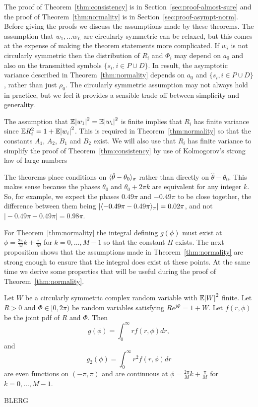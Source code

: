 \documentclass[journal]{IEEEtran}
\begin{document}
The proof of Theorem~\ref{thm:consistency} is in Section~\ref{sec:proof-almost-sure} and the proof of Theorem~\ref{thm:normality} is in Section~\ref{sec:proof-asympt-norm}.  Before giving the proofs we discuss the assumptions made by these theorems.  The assumption that $w_1, \dots w_L$ are circularly symmetric can be relaxed, but this comes at the expense of making the theorem statements more complicated.  If $w_i$ is not circularly symmetric then the distribution of $R_i$ and $\Phi_i$ may depend on $a_0$ and also on the transmitted symbols $\{s_i,i \in P \cup D\}$.  In result, the asymptotic variance described in Theorem~\ref{thm:normality} depends on $a_0$ and $\{s_i,i \in P \cup D\}$, rather than just $\rho_0$.  The circularly symmetric assumption may not always hold in practice, but we feel it provides a sensible trade off between simplicity and generality.  

The assumption that ${\mathbb E} {\vert w_1 \vert}^2 = {\mathbb E} {\vert w_i \vert}^2$ is finite implies that $R_i$ has finite variance since ${\mathbb E} R_i^2 = 1 + {\mathbb E} {\left\vert w_i \right\vert}^2$.  This is required in Theorem~\ref{thm:normality} so that the constants $A_1$, $A_2$, $B_1$ and $B_2$ exist.  We will also use that $R_i$ has finite variance to simplify the proof of Theorem~\ref{thm:consistency} by use of Kolmogorov's strong law of large numbers~\cite[Theorem 2.3.10]{SenSinger_large_sample_stats_1993}


The theorems place conditions on $\langle \hat{\theta} - \theta_0 \rangle_\pi$ rather than directly on $\hat{\theta} - \theta_0$.  This makes sense because the phases $\theta_0$ and $\theta_0 + 2\pi k$ are equivalent for any integer $k$. So, for example, we expect the phases $0.49\pi$ and $-0.49\pi$ to be close together, the difference between them being $\vert\langle -0.49\pi - 0.49\pi \rangle_\pi\vert = 0.02\pi$, and not $\vert -0.49\pi - 0.49\pi\vert = 0.98\pi$.

For Theorem~\ref{thm:normality} the integral defining $g(\phi)$ must exist at $\phi = \tfrac{2\pi}{M}k + \frac{\pi}{M}$ for $k = 0, \dots, M-1$ so that the constant $H$ exists.  The next proposition shows that the assumptions made in Theorem~\ref{thm:normality} are strong enough to ensure that the integral does exist at these points.  At the same time we derive some properties that will be useful during the proof of Theorem~\ref{thm:normality}.

\begin{proposition}\label{prop:gg2cont}
Let $W$ be a circularly symmetric complex random variable with ${\mathbb E}{\left\vert W \right\vert}^2$ finite.  Let $R > 0$ and $\Phi \in [0, 2\pi)$ be random variables satisfying $R e^{j\Phi} = 1 + W$.  Let $f(r,\phi)$ be the joint pdf of $R$ and $\Phi$.  Then
\[
g(\phi) = \int_{0}^\infty r f(r, \phi) dr,
\]
and
\[
g_2(\phi) = \int_{0}^\infty r^2 f(r, \phi) dr
\]
are even functions on $(-\pi,\pi)$ and are continuous at $\phi = \tfrac{2\pi}{M}k + \frac{\pi}{M}$ for $k = 0, \dots, M-1$.
\end{proposition}
\begin{IEEEproof}
BLERG
\end{IEEEproof}
\end{document}
